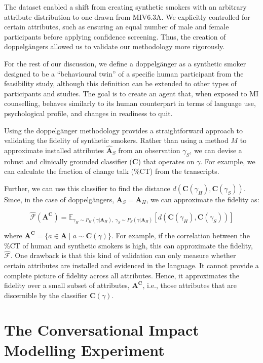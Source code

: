 The dataset enabled a shift from creating synthetic smokers with an arbitrary attribute
distribution to one drawn from MIV6.3A. We explicitly controlled for certain
attributes, such as ensuring an equal number of male and female participants before
applying confidence screening. Thus, the creation of doppelgängers allowed us to
validate our methodology more rigorously.

For the rest of our discussion, we define a doppelgänger as a synthetic smoker designed
to be a ``behavioural twin'' of a specific human participant from the feasibility
study, although this definition can be extended to other types of participants and
studies. The goal is to create an agent that, when exposed to MI counselling, behaves
similarly to its human counterpart in terms of language use, psychological profile, and
changes in readiness to quit.

Using the doppelgänger methodology provides a straightforward approach to validating
the fidelity of synthetic smokers. Rather than using a method $M$ to approximate
installed attributes $\hat{\textbf{A}}_S$ from an observation $\gamma_S$, we can devise
a robust and clinically grounded classifier ($\textbf{C}$) that operates on $\gamma$.
For example, we can calculate the fraction of change talk (\%CT) from the transcripts.

Further, we can use this classifier to find the distance $d(\textbf{C}(\gamma_H),
	\textbf{C}(\gamma_S))$. Since, in the case of doppelgängers, $\textbf{A}_S =
	\textbf{A}_H$, we can approximate the fidelity as:

$$\hat{\mathcal{F}}(\textbf{A}^\textbf{C}) = \mathbb{E}_{\gamma_H \sim P_H (\gamma | \textbf{A}_H),  \:  \gamma_S \sim P_S(\gamma | \textbf{A}_H)}[d(
	\textbf{C}(\gamma_H),\textbf{C}(\gamma_S)
	)]$$

where $\textbf{A}^\textbf{C} = \{a \in \textbf{A} \mid a \sim \textbf{C}(\gamma)\}$.
For example, if the correlation between the \%CT of human and synthetic smokers is
high, this can approximate the fidelity, $\hat{\mathcal{F}}$. One drawback is that this
kind of validation can only measure whether certain attributes are installed and
evidenced in the language. It cannot provide a complete picture of fidelity across all
attributes. Hence, it approximates the fidelity over a small subset of attributes,
$\textbf{A}^\textbf{C}$, i.e., those attributes that are discernible by the classifier
$\textbf{C}(\gamma)$.

\section{The Conversational Impact Modelling Experiment}
\label{sec:transcript-autoplay}

